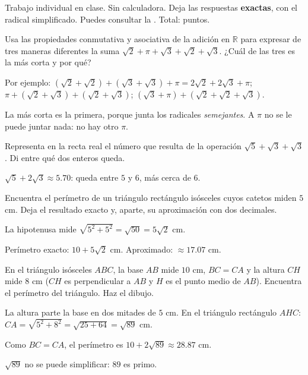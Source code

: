 \documentclass[11pt]{article}
\begin{document}
\encabezado

\begin{instrucciones}
Trabajo individual en clase. Sin calculadora. Deja las respuestas \textbf{exactas}, con el
radical simplificado. Puedes consultar la .
Total: \totalpuntos{} puntos.
\end{instrucciones}

\begin{preguntas}

\pregunta[1] Usa las propiedades conmutativa y asociativa de la adición en $\mathbb{R}$ para
expresar de tres maneras diferentes la suma $\sqrt{2} + \pi + \sqrt{3} + \sqrt{2} + \sqrt{3}$.
¿Cuál de las tres es la más corta y por qué?
\begin{solucion}[4cm]
Por ejemplo: $(\sqrt{2} + \sqrt{2}) + (\sqrt{3} + \sqrt{3}) + \pi = 2\sqrt{2} + 2\sqrt{3} + \pi$;
\quad $\pi + (\sqrt{2} + \sqrt{3}) + (\sqrt{2} + \sqrt{3})$; \quad
$(\sqrt{3} + \pi) + (\sqrt{2} + \sqrt{2} + \sqrt{3})$.

La más corta es la primera, porque junta los radicales \emph{semejantes}. A $\pi$ no se le puede
juntar nada: no hay otro $\pi$.
\end{solucion}

\pregunta[1] Representa en la recta real el número que resulta de la operación
$\sqrt{5} + \sqrt{3} + \sqrt{3}$. Di entre qué dos enteros queda.
\begin{solucion}[3.5cm]
$\sqrt{5} + 2\sqrt{3} \approx \num{5,70}$: queda entre $5$ y $6$, más cerca de $6$.
\end{solucion}

\pregunta[1] Encuentra el perímetro de un triángulo rectángulo isósceles cuyos catetos miden
$5$ cm. Deja el resultado exacto y, aparte, su aproximación con dos decimales.
\begin{solucion}[3.5cm]
La hipotenusa mide $\sqrt{5^2 + 5^2} = \sqrt{50} = 5\sqrt{2}$ cm.

Perímetro exacto: $10 + 5\sqrt{2}$ cm. Aproximado: $\approx \num{17,07}$ cm.
\end{solucion}

\pregunta[2] En el triángulo isósceles $ABC$, la base $AB$ mide $10$ cm, $BC = CA$ y la altura
$CH$ mide $8$ cm ($CH$ es perpendicular a $AB$ y $H$ es el punto medio de $AB$). Encuentra el
perímetro del triángulo. Haz el dibujo.
\begin{solucion}[6cm]
La altura parte la base en dos mitades de $5$ cm. En el triángulo rectángulo $AHC$:
$CA = \sqrt{5^2 + 8^2} = \sqrt{25 + 64} = \sqrt{89}$ cm.

Como $BC = CA$, el perímetro es $10 + 2\sqrt{89} \approx \num{28,87}$ cm.

$\sqrt{89}$ no se puede simplificar: $89$ es primo.
\end{solucion}

\end{preguntas}
\end{document}
